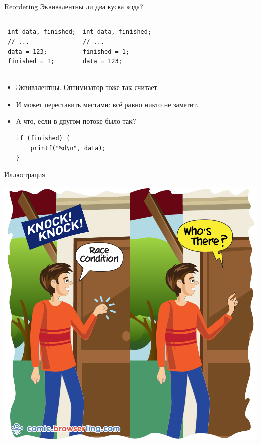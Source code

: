 \begin{frame}[fragile]{Reordering}
	Эквивалентны ли два куска кода?
	\begin{center}
		\begin{tabular}{p{}p{}}
\begin{verbatim}
int data, finished;
// ...
data = 123;
finished = 1;
\end{verbatim}
			&
\begin{verbatim}
int data, finished;
// ...
finished = 1;
data = 123;
\end{verbatim}
		\end{tabular}
	\end{center}
	\pause
	\begin{itemize}
		\item Эквивалентны. Оптимизатор тоже так считает.
		\pause\item И может переставить местами: всё равно никто не заметит.
		\pause\item А что, если в другом потоке было так?
\begin{verbatim}
if (finished) {
    printf("%d\n", data);
}
\end{verbatim}
	\end{itemize}
\end{frame}

\begin{frame}{Иллюстрация}
	\begin{center}
		\includegraphics[scale=0.2]{race-condition-knock-knock.jpg}
	\end{center}
\end{frame}

